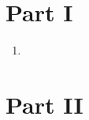 \documentclass{article}
\title{}
\date{}
\begin{document}
\section*{Part I}
\begin{enumerate}
\item {}
\end{enumerate}

\section*{Part II}
\end{document}
